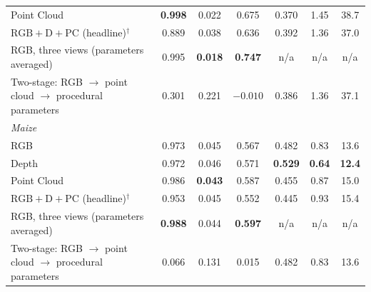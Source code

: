 \documentclass[10pt,twocolumn,letterpaper]{article}
\begin{document}
\begin{table}[t]
{\begin{tabular}{l cc c ccc}
    Point Cloud & \textbf{0.998} & 0.022 & 0.675 & 0.370 & 1.45 & 38.7 \\
    $\mathrm{RGB}+\mathrm{D}+\mathrm{PC}$ (headline)$^\dagger$ & 0.889 & 0.038 & 0.636 & 0.392 & 1.36 & 37.0 \\
    RGB, three views (parameters averaged) & 0.995 & \textbf{0.018} & \textbf{0.747} & n/a& n/a& n/a\\
    \midrule
    Two-stage: RGB $\to$ point cloud $\to$ procedural parameters & 0.301 & 0.221 & $-0.010$ & 0.386 & 1.36 & 37.1 \\
    \midrule
    \multicolumn{7}{l}{\emph{Maize}} \\
    RGB & 0.973 & 0.045 & 0.567 & 0.482 & 0.83 & 13.6 \\
    Depth & 0.972 & 0.046 & 0.571 & \textbf{0.529} & \textbf{0.64} & \textbf{12.4} \\
    Point Cloud & 0.986 & \textbf{0.043} & 0.587 & 0.455 & 0.87 & 15.0 \\
    $\mathrm{RGB}+\mathrm{D}+\mathrm{PC}$ (headline)$^\dagger$ & 0.953 & 0.045 & 0.552 & 0.445 & 0.93 & 15.4 \\
    RGB, three views (parameters averaged) & \textbf{0.988} & 0.044 & \textbf{0.597} & n/a& n/a& n/a\\
    \midrule
    Two-stage: RGB $\to$ point cloud $\to$ procedural parameters & 0.066 & 0.131 & 0.015 & 0.482 & 0.83 & 13.6 \\
    \bottomrule
  \end{tabular}}
\end{table}
\end{document}

